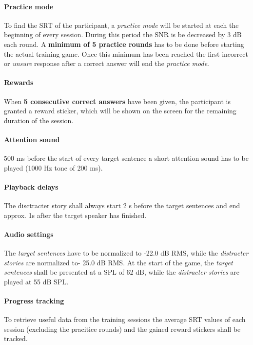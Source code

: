 \documentclass[a4paper,11pt]{article}%
\renewcommand{\\}{\vspace*{0.5\baselineskip} \newline}
\begin{document}
\paragraph{Practice mode} To find the \ac{SRT} of the participant, a \textit{practice mode} will be started at each the beginning of every session. During this period the \ac{SNR} is be decreased by 3 dB each round. A \textbf{minimum of 5 practice rounds} has to be done before starting the actual training game. Once this minimum has been reached the first incorrect or \textit{unsure} response after a correct answer will end the \textit{practice mode}.


\paragraph{Rewards} When \textbf{5 consecutive correct answers} have been given, the participant is granted a reward sticker, which will be shown on the screen for the remaining duration of the session.


\paragraph{Attention sound} 500 ms before the start of every target sentence a short attention sound has to be played (1000 Hz tone of 200 ms).


\paragraph{Playback delays} The disctracter story shall always start 2 s before the target sentences and end approx. 1s after the target speaker has finished.


\paragraph{Audio settings} The \textit{target sentences} have to be normalized to -22.0 dB \acs{RMS}, while the \textit{distracter stories} are normalized to- 25.0 dB \acs{RMS}. At the start of the game, the \textit{target sentences} shall be presented at a \acs{SPL} of 62 dB, while the \textit{distracter stories} are played at 55 dB \acs{SPL}.


\paragraph{Progress tracking} To retrieve useful data from the training sessions the average \ac{SRT} values of each session (excluding the pracitice rounds) and the gained reward stickers shall be tracked.
\end{document}
